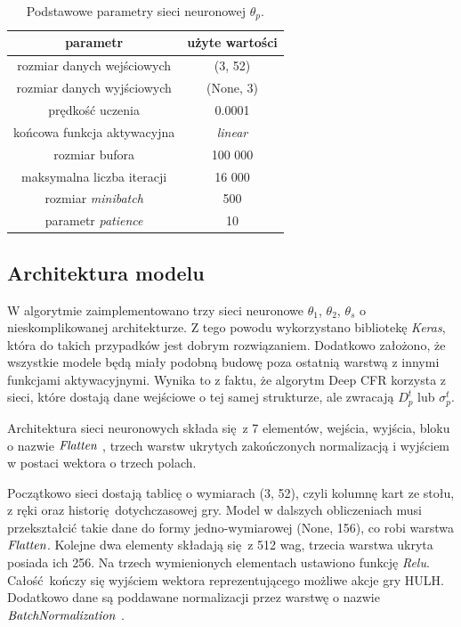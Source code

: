 \documentclass[12pt,oneside,a4paper]{report}
\begin{document}
\begin{table}[h!]
\centering
\caption{Podstawowe parametry sieci neuronowej $\theta_{p}$.}
\begin{tabular}{|c|c| }
   \hline
   parametr & użyte wartości \\
    \hline
   rozmiar danych wejściowych & (3, 52) \\
   \hline
   rozmiar danych wyjściowych & (None, 3) \\  
   \hline
   prędkość uczenia & 0.0001 \\
   \hline
   końcowa funkcja aktywacyjna & \emph{linear} \\
   \hline
   rozmiar bufora & 100 000 \\
   \hline
   maksymalna liczba iteracji & 16 000 \\
   \hline
   rozmiar \emph{minibatch} &  500\\
   \hline
   parametr \emph{patience} &  10\\
   \hline
\end{tabular}
\end{table}

\vspace{5cm}
\subsection{Architektura modelu}

W algorytmie zaimplementowano trzy sieci neuronowe $\theta_{1}$, $\theta_{2}$, $\theta_{s}$ o nieskomplikowanej architekturze. Z tego powodu
wykorzystano bibliotekę \emph{Keras}, która do takich przypadków jest dobrym rozwiązaniem. 
Dodatkowo
założono, że
wszystkie modele będą miały podobną budowę poza ostatnią warstwą z innymi funkcjami
aktywacyjnymi. Wynika to z faktu, że algorytm Deep CFR korzysta z sieci, które dostają dane wejściowe
o tej samej strukturze, ale zwracają $D_{p}^{t}$ lub $\sigma_{p}^{t}$.

Architektura sieci neuronowych składa się z 7 elementów, wejścia, wyjścia, bloku o nazwie
$\emph{Flatten}$ \cite{tensorflow}, 
trzech warstw ukrytych zakończonych normalizacją i wyjściem w postaci wektora o trzech polach.


Początkowo sieci dostają tablicę o wymiarach (3, 52), czyli kolumnę kart ze stołu, z ręki oraz
historię dotychczasowej gry. Model w dalszych obliczeniach musi
przekształcić takie dane do formy jedno-wymiarowej (None, 156), co robi warstwa $\emph{Flatten}$.
Kolejne dwa elementy składają się z 512 wag, trzecia warstwa ukryta posiada ich 256.
Na trzech wymienionych elementach ustawiono funkcję \emph{Relu}.
Całość kończy się wyjściem wektora reprezentującego możliwe akcje gry HULH.
Dodatkowo dane są poddawane normalizacji przez warstwę o nazwie $\emph{BatchNormalization}$
\cite{tensorflow}.
\end{document}
